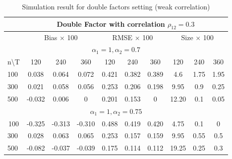 	\begin{table}[]
		\caption{Simulation result for double factors setting (weak correlation)}\label{table:exp3}
		\centering
	\begin{tabular}{lccccccccc}
		\hline
		\hline
		\multicolumn{1}{l|}{}                   & \multicolumn{9}{c}{Double Factor with correlation $\rho_{12} = 0.3$}                                                               \\ \hline
		\multicolumn{1}{l|}{}                   & \multicolumn{3}{c|}{Bias $\times$ 100}        & \multicolumn{3}{c|}{RMSE $\times$ 100}     & \multicolumn{3}{c}{Size $\times$ 100} \\ \hline
		\multicolumn{10}{c}{$\alpha_1 = 1, \alpha_2 = 0.7$}                                                                                                                            \\ \hline
		\multicolumn{1}{l|}{n\textbackslash{}T} & 120    & 240    & \multicolumn{1}{c|}{360}    & 120   & 240   & \multicolumn{1}{c|}{360}   & 120          & 240        & 360        \\ \hline
		\multicolumn{1}{l|}{100}                & 0.038  & 0.064  & \multicolumn{1}{c|}{0.072}  & 0.421 & 0.382 & \multicolumn{1}{c|}{0.389} & 4.6          & 1.75       & 1.95       \\
		\multicolumn{1}{l|}{300}                & 0.021  & 0.058  & \multicolumn{1}{c|}{0.056}  & 0.253 & 0.206 & \multicolumn{1}{c|}{0.198} & 9.95         & 0.9        & 0.25       \\
		\multicolumn{1}{l|}{500}                & -0.032 & 0.006  & \multicolumn{1}{c|}{0}      & 0.201 & 0.153 & \multicolumn{1}{c|}{0}     & 12.20        & 0.1        & 0.05       \\ \hline
		\multicolumn{10}{c}{$\alpha_1 = 1, \alpha_2 = 0.75$}                                                                                                                          \\ \hline
		\multicolumn{1}{c|}{100}                & -0.325 & -0.313 & \multicolumn{1}{c|}{-0.310} & 0.488 & 0.419 & \multicolumn{1}{c|}{0.420} & 4.75         & 0.1        & 0          \\
		\multicolumn{1}{l|}{300}                & 0.028  & 0.063  & \multicolumn{1}{c|}{0.065}  & 0.253 & 0.157 & \multicolumn{1}{c|}{0.159} & 9.95         & 0.55       & 0.5        \\
		\multicolumn{1}{l|}{500}                & -0.082 & -0.037 & \multicolumn{1}{c|}{-0.039} & 0.175 & 0.114 & \multicolumn{1}{c|}{0.112} & 19.25        & 0.25       & 0.3        \\ \hline

\end{tabular}
\end{table}

